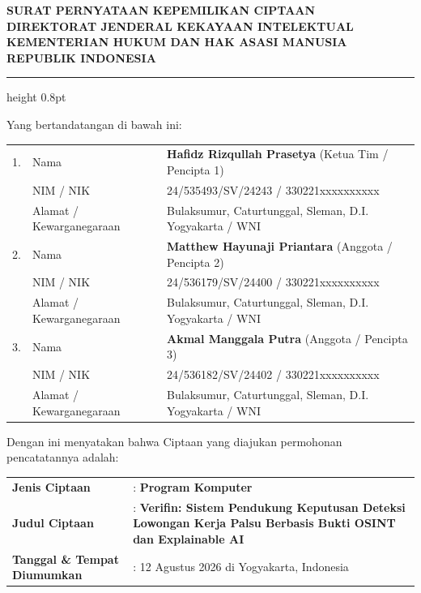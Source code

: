 \documentclass[10pt,a4paper]{article}
\begin{document}
\begin{center}
    {\fontsize{12}{14}\selectfont\textbf{SURAT PERNYATAAN KEPEMILIKAN CIPTAAN}}\\[2pt]
    {\fontsize{10}{12}\selectfont\textbf{DIREKTORAT JENDERAL KEKAYAAN INTELEKTUAL}}\\[1pt]
    {\fontsize{9}{11}\selectfont\textbf{KEMENTERIAN HUKUM DAN HAK ASASI MANUSIA REPUBLIK INDONESIA}}
\end{center}

\vspace{0.4em}
\hrule height 0.8pt
\vspace{0.6em}

Yang bertandatangan di bawah ini:

\vspace{0.2em}
\begin{tabularx}{\textwidth}{@{}p{0.5cm}p{3.5cm}X@{}}
1. & Nama & \textbf{Hafidz Rizqullah Prasetya} (Ketua Tim / Pencipta 1) \\
   & NIM / NIK & 24/535493/SV/24243 / 330221xxxxxxxxxx \\
   & Alamat / Kewarganegaraan & Bulaksumur, Caturtunggal, Sleman, D.I. Yogyakarta / WNI \\[3pt]
2. & Nama & \textbf{Matthew Hayunaji Priantara} (Anggota / Pencipta 2) \\
   & NIM / NIK & 24/536179/SV/24400 / 330221xxxxxxxxxx \\
   & Alamat / Kewarganegaraan & Bulaksumur, Caturtunggal, Sleman, D.I. Yogyakarta / WNI \\[3pt]
3. & Nama & \textbf{Akmal Manggala Putra} (Anggota / Pencipta 3) \\
   & NIM / NIK & 24/536182/SV/24402 / 330221xxxxxxxxxx \\
   & Alamat / Kewarganegaraan & Bulaksumur, Caturtunggal, Sleman, D.I. Yogyakarta / WNI \\
\end{tabularx}

\vspace{0.5em}
Dengan ini menyatakan bahwa Ciptaan yang diajukan permohonan pencatatannya adalah:
\vspace{0.2em}

\begin{tabularx}{\textwidth}{@{}p{4.2cm}X@{}}
\textbf{Jenis Ciptaan} & : \textbf{Program Komputer} \\
\textbf{Judul Ciptaan} & : \textbf{Verifin: Sistem Pendukung Keputusan Deteksi Lowongan Kerja Palsu Berbasis Bukti OSINT dan Explainable AI} \\
\textbf{Tanggal \& Tempat Diumumkan} & : 12 Agustus 2026 di Yogyakarta, Indonesia \\
\end{tabularx}
\end{document}
